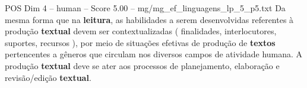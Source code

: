\begin{textsample}{POS Dim 4 – human – Score 5.00 – mg/mg\_ef\_linguagens\_lp\_5\_p5.txt}  \label{ex:f4_pos_009}
Da mesma forma que na \textbf{leitura}, as habilidades a serem desenvolvidas referentes à produção \textbf{textual} devem ser contextualizadas ( finalidades, interlocutores, suportes, recursos ), por meio de situações efetivas de produção de \textbf{textos} pertencentes a gêneros que circulam nos diversos campos de atividade humana.
A produção \textbf{textual} deve se ater aos processos de planejamento, elaboração e revisão/edição \textbf{textual}.

\end{textsample}
